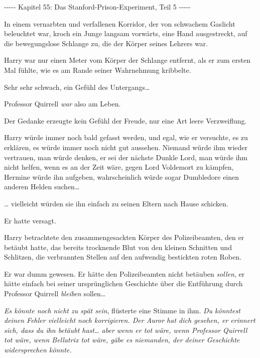 

\hypertarget{das-stanford-prison-experiment-teil-5}{%

-\/-\/-\/-\/- Kapitel 55: Das Stanford-Prison-Experiment, Teil 5 -\/-\/-\/-\/-

In einem vernarbten und verfallenen Korridor, der von schwachem Gaslicht beleuchtet war, kroch ein Junge langsam vorwärts, eine Hand ausgestreckt, auf die bewegungslose Schlange zu, die der Körper seines Lehrers war.

Harry war nur einen Meter vom Körper der Schlange entfernt, als er zum ersten Mal fühlte, wie es am Rande seiner Wahrnehmung kribbelte.

Sehr sehr schwach, ein Gefühl des Untergangs…

Professor Quirrell \emph{war} also am Leben.

Der Gedanke erzeugte kein Gefühl der Freude, nur eine Art leere Verzweiflung.

Harry würde immer noch bald gefasst werden, und egal, wie er versuchte, es zu erklären, es würde immer noch nicht gut aussehen. Niemand würde ihm wieder vertrauen, man würde denken, er sei der nächste Dunkle Lord, man würde ihm nicht helfen, wenn es an der Zeit wäre, gegen Lord Voldemort zu kämpfen, Hermine würde ihn aufgeben, wahrscheinlich würde sogar Dumbledore einen anderen Helden suchen…

… vielleicht würden sie ihn einfach zu seinen Eltern nach Hause schicken.

Er hatte versagt.

Harry betrachtete den zusammengesackten Körper des Polizeibeamten, den er betäubt hatte, das bereits trocknende Blut von den kleinen Schnitten und Schlitzen, die verbrannten Stellen auf den aufwendig bestickten roten Roben.

Er war dumm gewesen. Er hätte den Polizeibeamten nicht betäuben \emph{sollen}, er hätte einfach bei seiner ursprünglichen Geschichte über die Entführung durch Professor Quirrell \emph{bleiben} sollen…

\emph{Es könnte noch nicht zu spät sein}, flüsterte eine Stimme in ihm. \emph{Du könntest deinen Fehler vielleicht noch korrigieren. Der Auror hat dich gesehen, er erinnert sich, dass du ihn betäubt hast… aber wenn er tot wäre, wenn Professor Quirrell tot wäre, wenn Bellatrix tot wäre, gäbe es niemanden, der deiner Geschichte widersprechen könnte.}

}
